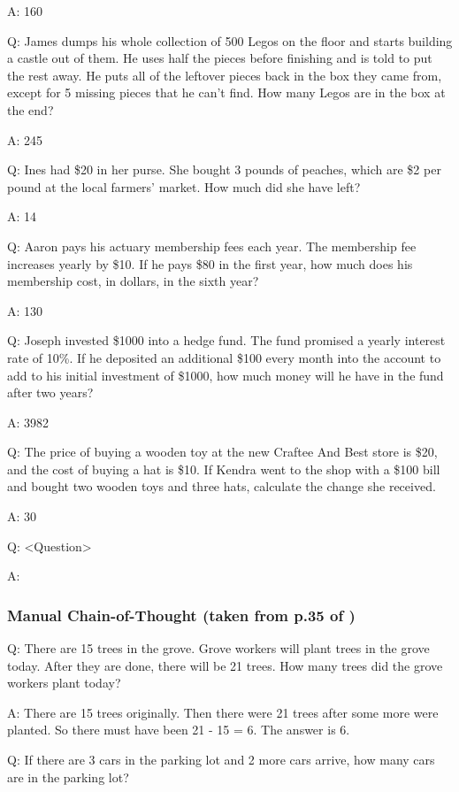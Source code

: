 \documentclass[11pt]{article}
\begin{document}
A: 160

Q: James dumps his whole collection of 500 Legos on the floor and starts building a castle out of them.  He uses half the pieces before finishing and is told to put the rest away.  He puts all of the leftover pieces back in the box they came from, except for 5 missing pieces that he can't find.  How many Legos are in the box at the end?

A: 245

Q: Ines had \$20 in her purse. She bought 3 pounds of peaches, which are \$2 per pound at the local farmers' market. How much did she have left?

A: 14

Q: Aaron pays his actuary membership fees each year. The membership fee increases yearly by \$10. If he pays \$80 in the first year, how much does his membership cost, in dollars, in the sixth year?

A: 130

Q: Joseph invested \$1000 into a hedge fund. The fund promised a yearly interest rate of 10\%. If he deposited an additional \$100 every month into the account to add to his initial investment of \$1000, how much money will he have in the fund after two years?

A: 3982

Q: The price of buying a wooden toy at the new Craftee And Best store is \$20, and the cost of buying a hat is \$10. If Kendra went to the shop with a \$100 bill and bought two wooden toys and three hats, calculate the change she received.

A: 30

Q: <Question>

A:

\subsubsection*{Manual Chain-of-Thought (taken from p.35 of \citealp{wei_chain--thought_nodate})}

Q: There are 15 trees in the grove. Grove workers will plant trees in the grove today. After they are done, there will be 21 trees. How many trees did the grove workers plant today?

A: There are 15 trees originally. Then there were 21 trees after some more were planted. So there must have been 21 - 15 = 6. The answer is 6.

Q: If there are 3 cars in the parking lot and 2 more cars arrive, how many cars are in the parking lot?
\end{document}
